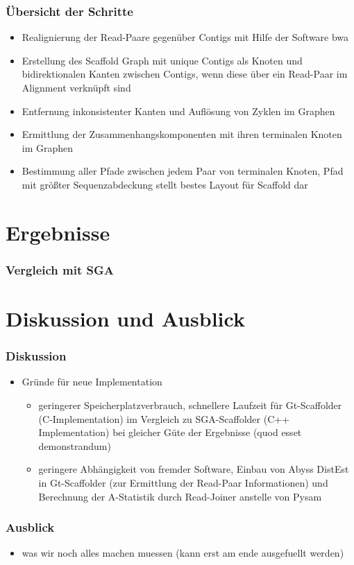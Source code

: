 \documentclass[xcolor=pst]{beamer}
\begin{document}
\begin{frame}
  \frametitle{Übersicht der Schritte}
  \begin{itemize}
  \item Realignierung der Read-Paare gegenüber Contigs mit Hilfe der
    Software bwa
  \item Erstellung des Scaffold Graph mit unique Contigs als Knoten und
    bidirektionalen Kanten zwischen Contigs, wenn diese über ein
    Read-Paar im Alignment verknüpft sind
  \item Entfernung inkonsistenter Kanten und Auflösung von Zyklen
    im Graphen
  \item Ermittlung der Zusammenhangskomponenten mit ihren terminalen
    Knoten im Graphen
  \item Bestimmung aller Pfade zwischen jedem Paar von terminalen
    Knoten, Pfad mit größter Sequenzabdeckung stellt bestes Layout
    für Scaffold dar
  \end{itemize}
\end{frame}

\section{Ergebnisse}
\begin{frame}
  \frametitle{Vergleich mit SGA}

\end{frame}

\section{Diskussion und Ausblick}
\begin{frame}
  \frametitle{Diskussion}
  \begin{itemize}
  \item Gründe für neue Implementation
    \begin{itemize}
    \item geringerer Speicherplatzverbrauch, schnellere Laufzeit
       für Gt-Scaffolder (C-Implementation) im Vergleich zu
       SGA-Scaffolder (C++ Implementation) bei gleicher Güte
       der Ergebnisse (quod esset demonstrandum)
    \item geringere Abhängigkeit von fremder Software, Einbau
      von Abyss DistEst in Gt-Scaffolder (zur Ermittlung der
      Read-Paar Informationen) und Berechnung der A-Statistik
      durch Read-Joiner anstelle von Pysam
    \end{itemize}
  \end{itemize}
\end{frame}

\begin{frame}
  \frametitle{Ausblick}
  \begin{itemize}
  \item was wir noch alles machen muessen (kann erst am ende
    ausgefuellt werden)
  \end{itemize}
\end{frame}
\end{document}
